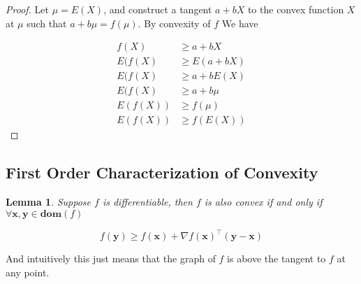 \documentclass{article}
\newtheorem{lemma}[theorem]{Lemma}
\begin{document}
	\begin{proof}
		Let $\mu = E(X)$, and construct a tangent $a+bX$ to the convex function $X$ at $\mu$ such that $a + b\mu = f(\mu)$. By convexity of $f$ We have
		
		\begin{align*}
			f(X) &\ge a+bX\\
			E(f(X) &\ge E(a+bX)\\
			E(f(X) &\ge a+bE(X)\\
			E(f(X) &\ge a+b\mu\\
			E(f(X)) &\ge f(\mu)\\
			E(f(X)) &\ge f(E(X))
		\end{align*}
	\end{proof}
	
	\subsection{First Order Characterization of Convexity}

		\begin{lemma}
			Suppose $f$ is differentiable, then $f$ is also convex if and only if $\forall\mathbf{x, y}\in\mathbf{dom}(f)$
			
			\[ f(\mathbf{y}) \ge f(\mathbf{x}) + \nabla f(\mathbf{x})^\top(\mathbf{y-x})  \]
		\end{lemma}
		
		And intuitively this just means that the graph of $f$ is above the tangent to $f$ at any point.
		
\end{document}

